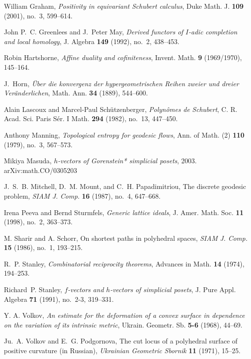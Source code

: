 \documentclass[11pt]{proposal}
\begin{document}
\begin{thebibliography}{Mat01b}
William Graham, \emph{Positivity in equivariant Schubert calculus},
  Duke Math. J. \textbf{109} (2001), no.~3, 599--614.

John P.~C. Greenlees and J.~Peter May, \emph{Derived functors of
  \mbox{${I}$-adic} completion and local homology}, J. Algebra \textbf{149}
  (1992), no.~2, \mbox{438--453}.

Robin Hartshorne, \emph{Affine duality and cofiniteness},
  Invent. Math. \textbf{9} (1969/1970), 145--164.

J.~Horn, \emph{ {\"Uber die konvergenz der hypergeometrischen {R}eihen
  zweier und dreier Ver\"ander\-lichen}}, Math. Ann. \textbf{34} (1889),
  544--600.

Alain Lascoux and Marcel-Paul Sch{\"u}tzenberger, \emph{Polyn\^omes de
  {S}chubert}, C. R. Acad. Sci. Paris S\'er. I Math. \textbf{294}
  (1982), no.~13, 447--450.

Anthony Manning, \emph{Topological entropy for geodesic flows},
  Ann. of Math. (2) \textbf{110} (1979), no.~3, 567--573.

Mikiya Masuda, \emph{$h$-vectors of Gorenstein$\!$* simplicial
  posets}, 2003.  \textsf{arXiv:math.CO/0305203}

J.~S.~B. Mitchell, D.~M. Mount, and C.~H. Papadimitriou,  The
  discrete geodesic problem, \emph{SIAM J.  Comp.} \textbf{16}
  (1987), no.~4, 647--668.

Irena Peeva and Bernd Sturmfels, \emph{Generic lattice ideals},
  J. Amer. Math. Soc. \textbf{11} (1998), no.~2, 363--373.

M. Sharir and A. Schorr, On shortest paths in polyhedral spaces,
  \emph{SIAM J. Comp.} \textbf{15} (1986), no.~1, 193--215.

R.~P. Stanley, \emph{Combinatorial reciprocity theorems}, Advances in
  Math. \textbf{14} (1974), 194--253.

Richard~P. Stanley, \emph{{$f$}-vectors and {$h$}-vectors of
  simplicial posets}, J. Pure Appl. Algebra \textbf{71} (1991),
  no.~2-3, 319--331.

Y. A. Volkov, \emph{An estimate for the deformation of a convex
  surface in dependence on the variation of its intrinsic
  metric}, Ukrain. Geometr. Sb. \textbf{5-6} (1968), 44--69.

Ju.~A. Volkov and E.~G. Podgornova, The cut locus of a polyhedral
  surface of positive curvature (in Russian), \emph{Ukrainian
  Geometric Sbornik} \textbf{11} (1971), 15--25.

\end{thebibliography}
\end{document}
